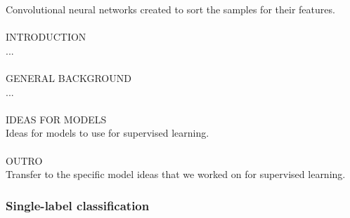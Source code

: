 Convolutional neural networks created to sort the samples for their features. \\
\\
INTRODUCTION \\
... \\
\\
GENERAL BACKGROUND \\
... \\
\\
IDEAS FOR MODELS \\
Ideas for models to use for supervised learning. \\
\\
OUTRO \\
Transfer to the specific model ideas that we worked on for supervised learning.

\subsubsection{Single-label classification}

